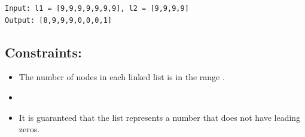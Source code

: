 \begin{lstlisting}
Input: l1 = [9,9,9,9,9,9,9], l2 = [9,9,9,9]
Output: [8,9,9,9,0,0,0,1]
\end{lstlisting}


\subsection*{Constraints:}

\begin{itemize}
  \item{The number of nodes in each linked list is in the range \code{[1, 100]}.}
  \item{}
  \item{It is guaranteed that the list represents a number that does not have leading zeros.}
\end{itemize}


\clearpage
